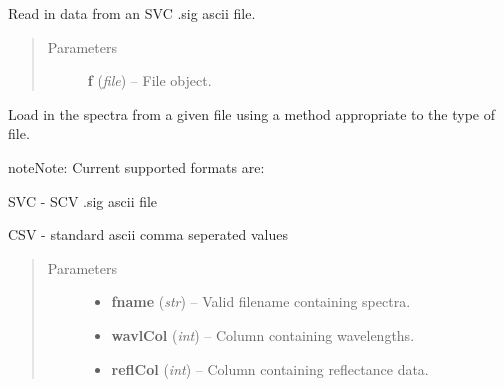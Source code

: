 \documentclass[letterpaper,10pt,english]{sphinxmanual}
\begin{document}
\begin{fulllineitems}
\begin{fulllineitems}
\begin{quote}
\begin{description}
\begin{itemize}
\end{itemize}

\end{description}\end{quote}

\end{fulllineitems}


\begin{fulllineitems}
\label{source/sentinel_simulator:sentinel_simulator.spectra.spectra.loadSVCSig}
Read in data from an SVC .sig ascii file.
\begin{quote}\begin{description}
\item[{Parameters}] \leavevmode
\textbf{f} (\emph{file}) -- File object.

\end{description}\end{quote}

\end{fulllineitems}


\begin{fulllineitems}
\label{source/sentinel_simulator:sentinel_simulator.spectra.spectra.loadSpectra}
Load in the spectra from a given file using a
method appropriate to the type of file.

\begin{notice}{note}{Note:}
Current supported formats are:

SVC - SCV .sig ascii file

CSV - standard ascii comma seperated values
\end{notice}
\begin{quote}\begin{description}
\item[{Parameters}] \leavevmode\begin{itemize}
\item {} 
\textbf{fname} (\emph{str}) -- Valid filename containing spectra.

\item {} 
\textbf{wavlCol} (\emph{int}) -- Column containing wavelengths.

\item {} 
\textbf{reflCol} (\emph{int}) -- Column containing reflectance data.


\end{itemize}
\end{description}
\end{quote}
\end{fulllineitems}
\end{fulllineitems}
\end{document}
